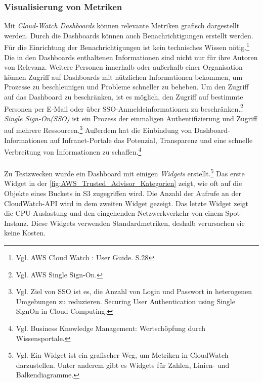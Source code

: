 \subsubsection*{Visualisierung von Metriken}
Mit \textit{Cloud-Watch Dashboards} können relevante Metriken grafisch dargestellt werden. %
Durch die Dashboards können auch Benachrichtigungen erstellt werden. Für die Einrichtung der Benachrichtigungen ist kein technisches Wissen nötig.\footnote{Vgl. AWS Cloud Watch : User Guide. S.28\cite{AMZ14}}
Die in den Dashboards enthaltenen Informationen sind nicht nur für ihre Autoren von Relevanz. Weitere Personen innerhalb oder außerhalb einer Organisation können Zugriff auf Dashboards mit nützlichen Informationen bekommen, um Prozesse zu beschleunigen und Probleme schneller zu beheben. Um den Zugriff auf das Dashboard zu beschränken, ist es möglich, den Zugriff auf bestimmte Personen per E-Mail oder über SSO-Anmeldeinformationen zu beschränken.\footnote{Vgl.  AWS Single Sign-On.\cite{AMZ33}}  \textit{Single Sign-On(SSO)} ist ein Prozess der einmaligen Authentifizierung und Zugriff auf mehrere Ressourcen.\footnote{Vgl. Ziel von SSO ist es, die Anzahl von Login und Passwort in heterogenen Umgebungen zu reduzieren. Securing User Authentication using Single SignOn in Cloud Computing\cite{SSO}.} Außerdem hat die Einbindung von Dashboard-Informationen auf Infranet-Portale das Potenzial, Transparenz und eine schnelle Verbreitung von Informationen zu schaffen.\footnote{Vgl. Business Knowledge Management: Wertschöpfung durch Wissensportale\cite{BKM}.}
\\\\
Zu Testzwecken wurde ein Dashboard mit einigen \textit{Widgets} erstellt.\footnote{Vgl. Ein Widget ist ein grafischer Weg, um Metriken in CloudWatch darzustellen. Unter anderem gibt es Widgets für Zahlen, Linien- und Balkendiagramme.} Das erste Widget in der \autoref{fig:AWS_Trusted_Advisor_Kategorien} zeigt, wie oft auf die Objekte eines Buckets in S3 zugegriffen wird. Die Anzahl der Aufrufe an der CloudWatch-API wird in dem zweiten Widget gezeigt. Das letzte Widget zeigt die CPU-Auslastung und den eingehenden Netzwerkverkehr von einem Spot-Instanz. Diese Widgets verwenden Standardmetriken, deshalb verursachen sie keine Kosten. 
